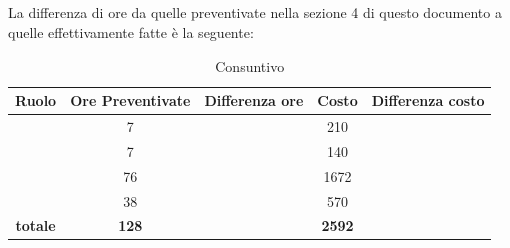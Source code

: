 \newpage

\subsection{\PD}
La differenza di ore da quelle preventivate nella sezione 4 di questo documento a quelle effettivamente fatte è la seguente:


\begin{table}[h]
	\begin{center}
		\begin{tabular}{|c|c|c|c|c|}
			\hline
			\textbf{Ruolo}	& \textbf{Ore Preventivate} & \textbf{Differenza ore} & \textbf{Costo} & \textbf{Differenza costo}\\
			\hline
			\Pm &	7  & &	210 &	\\
			\hline
			\Am	&	7 &	& 140 & \\
			\hline
			\Prog	&	76 & & 1672 & \\
			\hline
			\Ver &	38 & & 570 & \\
			\hline
			\textbf{totale}	&	\textbf{128} & & \textbf{2592} & \\
			\hline
		\end{tabular}
	\end{center}
	\caption{Consuntivo \PD}
\end{table}